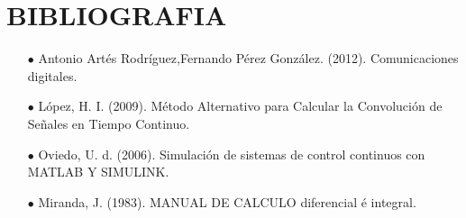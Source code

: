 \documentclass[11pt,a4paper]{article}
\begin{document}
	\section{{BIBLIOGRAFIA}}{
	\large{
	\begin{enumerate}
	\item[\textbf{$\bullet$}]
	Antonio Artés Rodríguez,Fernando Pérez González. (2012). Comunicaciones digitales. 
	\item[\textbf{$\bullet$}]
López, H. I. (2009). Método Alternativo para Calcular la Convolución de Señales en Tiempo Continuo. 
\item[\textbf{$\bullet$}]
Oviedo, U. d. (2006). Simulación de sistemas de control continuos con MATLAB Y SIMULINK. 
\item[\textbf{$\bullet$}]
Miranda, J. (1983). MANUAL DE CALCULO diferencial é integral. 
	\end{enumerate}
	}}
\end{document}
